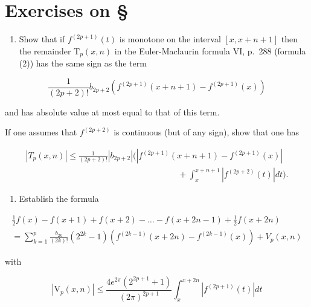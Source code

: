 \section*{Exercises on \S{}}
{}

\begin{enumerate}
\def\labelenumi{\arabic{enumi})}
\tightlist
\item
  Show that if \(f^{(2p + 1)}(t)\) is monotone on the interval \([x, x + n + 1]\) then the remainder \(\mathrm{T}_p(x, n)\) in the Euler-Maclaurin formula VI, p.~288 (formula (2)) has the same sign as the term
\end{enumerate}

\[
\frac {1}{(2 p + 2) !} b _ {2 p + 2} \left(f ^ {(2 p + 1)} (x + n + 1) - f ^ {(2 p + 1)} (x)\right)
\]

and has absolute value at most equal to that of this term.

If one assumes that \(f^{(2p+2)}\) is continuous (but of any sign), show that one has

\[
\begin{array}{c} \left| T _ {p} (x, n) \right| \leqslant \frac {1}{(2 p + 2) !} \left| b _ {2 p + 2} \right| \Bigg (\left| f ^ {(2 p + 1)} (x + n + 1) - f ^ {(2 p + 1)} (x) \right| \\ \qquad \qquad \qquad \qquad \qquad \qquad \qquad \qquad \qquad + \int_ {x} ^ {x + n + 1} \left| f ^ {(2 p + 2)} (t) \right| d t \Bigg). \end{array}
\]

\begin{enumerate}
\def\labelenumi{\arabic{enumi})}
\setcounter{enumi}{1}
\tightlist
\item
  Establish the formula
\end{enumerate}

\[
\begin{array}{l} \frac {1}{2} f (x) - f (x + 1) + f (x + 2) - \dots - f (x + 2 n - 1) + \frac {1}{2} f (x + 2 n) \\ = \sum_ {k = 1} ^ {p} \frac {b _ {2 k}}{(2 k) !} (2 ^ {2 k} - 1) (f ^ {(2 k - 1)} (x + 2 n) - f ^ {(2 k - 1)} (x)) + V _ {p} (x, n) \end{array}
\]

with

\[
\left| \mathrm{V} _ {p} (x, n) \right| \leqslant \frac {4 e ^ {2 \pi} \left(2 ^ {2 p + 1} + 1\right)}{(2 \pi) ^ {2 p + 1}} \int_ {x} ^ {x + 2 n} \left| f ^ {(2 p + 1)} (t) \right| d t
\]

